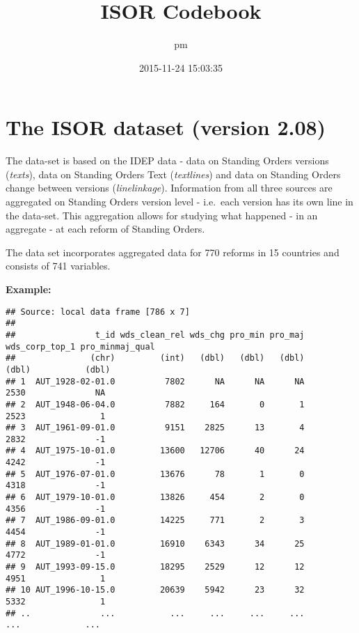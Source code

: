 \documentclass[]{article}
\title{ISOR Codebook}
\author{pm}
\date{2015-11-24 15:03:35}
\newenvironment{Shaded}{\begin{snugshade}}{\end{snugshade}}
\newcommand{\KeywordTok}[1]{\textcolor[rgb]{0.13,0.29,0.53}{\textbf{{#1}}}}
\newcommand{\StringTok}[1]{\textcolor[rgb]{0.31,0.60,0.02}{{#1}}}
\newcommand{\NormalTok}[1]{{#1}}
\begin{document}
\maketitle

\section{The ISOR dataset (version
2.08)}\label{the-isor-dataset-version-2.08}

The data-set is based on the IDEP data - data on Standing Orders
versions (\emph{texts}), data on Standing Orders Text (\emph{textlines})
and data on Standing Orders change between versions
(\emph{linelinkage}). Information from all three sources are aggregated
on Standing Orders version level - i.e.~each version has its own line in
the data-set. This aggregation allows for studying what happened - in an
aggregate - at each reform of Standing Orders.

The data set incorporates aggregated data for 770 reforms in 15
countries and consists of 741 variables.

\textbf{Example:}

\begin{Shaded}
\end{Shaded}

\begin{verbatim}
## Source: local data frame [786 x 7]
## 
##                t_id wds_clean_rel wds_chg pro_min pro_maj wds_corp_top_1 pro_minmaj_qual
##               (chr)         (int)   (dbl)   (dbl)   (dbl)          (dbl)           (dbl)
## 1  AUT_1928-02-01.0          7802      NA      NA      NA           2530              NA
## 2  AUT_1948-06-04.0          7882     164       0       1           2523               1
## 3  AUT_1961-09-01.0          9151    2825      13       4           2832              -1
## 4  AUT_1975-10-01.0         13600   12706      40      24           4242              -1
## 5  AUT_1976-07-01.0         13676      78       1       0           4318              -1
## 6  AUT_1979-10-01.0         13826     454       2       0           4356              -1
## 7  AUT_1986-09-01.0         14225     771       2       3           4454              -1
## 8  AUT_1989-01-01.0         16910    6343      34      25           4772              -1
## 9  AUT_1993-09-15.0         18295    2529      12      12           4951               1
## 10 AUT_1996-10-15.0         20639    5942      23      32           5332               1
## ..              ...           ...     ...     ...     ...            ...             ...
\end{verbatim}
\end{document}
